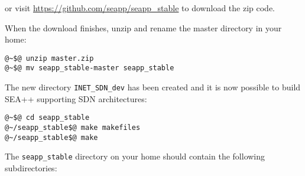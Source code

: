 or visit \url{https://github.com/seapp/seapp_stable} to download the zip code.

When the download finishes, unzip and rename the master directory in your home:
%
\begin{lstlisting}[language={terminal}]
@~$@ unzip master.zip
@~$@ mv seapp_stable-master seapp_stable
\end{lstlisting}
%

The new directory \texttt{INET\_SDN\_dev} has been created and it is now possible to build SEA++ supporting SDN architectures:
%
\begin{lstlisting}[language={terminal}]
@~$@ cd seapp_stable
@~/seapp_stable$@ make makefiles
@~/seapp_stable$@ make
\end{lstlisting}

The \texttt{seapp\_stable} directory on your home should contain the following subdirectories:
%
